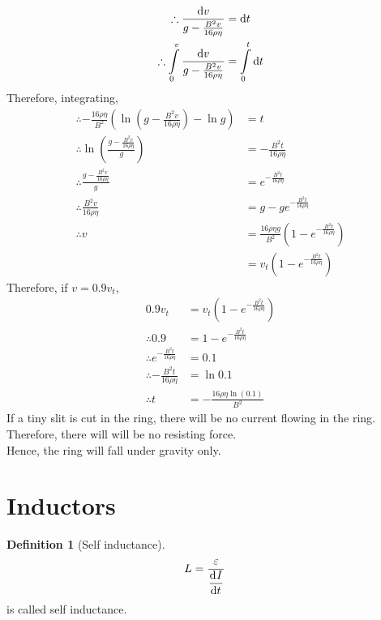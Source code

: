 \documentclass[fleqn, a4paper, 8pt, twoside]{amsart}
\theoremstyle{definition}
\newtheorem{definition}{Definition}
\theoremstyle{theorem}
\begin{document}
\begin{multicols}{2}
\begin{spacing}{0.6}
\begin{solution}
\begin{align*}
		\therefore \frac{\dif v}{g - \frac{B^2 v}{16 \rho \eta}} &= \dif t\\
		\therefore \int\limits_{0}^{v} \frac{\dif v}{g - \frac{B^2 v}{16 \rho \eta}} &= \int\limits_{0}^{t} \dif t
	\end{align*}
	Therefore, integrating,
	\begin{align*}
		\therefore -\frac{16 \rho \eta}{B^2} \left( \ln\left( g - \frac{B^2 v}{16 \rho \eta} \right) - \ln g \right) &= t\\
		\therefore \ln\left( \frac{g - \frac{B^2 v}{16 \rho \eta}}{g} \right) &= -\frac{B^2 t}{16 \rho \eta}\\
		\therefore \frac{g - \frac{B^2 v}{16 \rho \eta}}{g} &= e^{-\frac{B^2 t}{16 \rho \eta}}\\
		\therefore \frac{B^2 v}{16 \rho \eta} &= g - g e^{-\frac{B^2 t}{16 \rho \eta}}\\
		\therefore v &= \frac{16 \rho \eta g}{B^2} \left( 1 - e^{-\frac{B^2 t}{16 \rho \eta}} \right)\\
		&= v_t \left( 1 - e^{-\frac{B^2 t}{16 \rho \eta}} \right)
	\end{align*}
	Therefore, if $v = 0.9 v_t$,
	\begin{align*}
		0.9 v_t &= v_t \left( 1 - e^{-\frac{B^2 t}{16 \rho \eta}} \right)\\
		\therefore 0.9 &= 1 - e^{-\frac{B^2 t}{16 \rho \eta}}\\
		\therefore e^{-\frac{B^2 t}{16 \rho \eta}} &= 0.1\\
		\therefore -\frac{B^2 t}{16 \rho \eta} &= \ln 0.1\\
		\therefore t &= -\frac{16 \rho \eta \ln(0.1)}{B^2}
	\end{align*}
	If a tiny slit is cut in the ring, there will be no current flowing in the ring.\\
	Therefore, there will will be no resisting force.\\
	Hence, the ring will fall under gravity only.
\end{solution}

\section{Inductors}

\begin{definition}[Self inductance]
	\begin{align*}
		L &= \frac{\varepsilon}{\dod{I}{t}}
	\end{align*}
	is called self inductance.
\end{definition}


\end{spacing}
\end{multicols}
\end{document}
